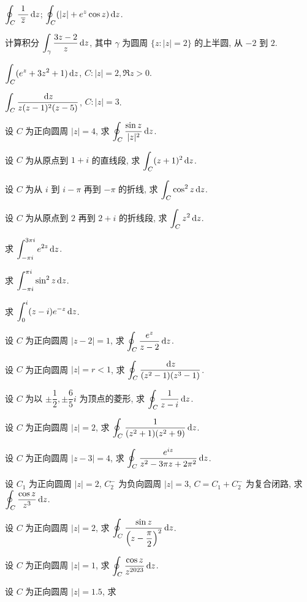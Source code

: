 \begin{homework}
\begin{exlist}
\begin{tasks}
				\task $\displaystyle\oint_C\dfrac{\ 1\ }{\overline z}\,\mathrm{d} z$;
				\task $\displaystyle\oint_C(|z|+e^z\cos z)\,\mathrm{d} z$.
			\end{tasks}
		\item 计算积分 $\displaystyle\int_\gamma\dfrac{3z-2}{z}\,\mathrm{d} z$, 其中 $\gamma$ 为圆周 $\{z: |z|=2\}$ 的上半圆, 从 $-2$ 到 $2$.
		\item $\displaystyle\int_C(e^z+3z^2+1)\,\mathrm{d} z$, $C:|z|=2,\Re z>0$.
		\item $\displaystyle\int_C\dfrac{\,\mathrm{d} z}{z(z-1)^2(z-5)}$, $C:|z|=3$.
		\item 设 $C$ 为正向圆周 $|z|=4$, 求 $\displaystyle\oint_C\dfrac{\sin z}{|z|^2}\,\mathrm{d} z$.
		\item 设 $C$ 为从原点到 $1+i$ 的直线段, 求 $\displaystyle\int_C(z+1)^2\,\mathrm{d} z$.
		\item 设 $C$ 为从 $i$ 到 $i-\pi$ 再到 $-\pi$ 的折线, 求 $\displaystyle\int_C\cos^2z\,\mathrm{d} z$.
		\item 设 $C$ 为从原点到 $2$ 再到 $2+i$ 的折线段, 求 $\displaystyle\int_Cz^2\,\mathrm{d} z$.
		\item 求 $\displaystyle\int_{-\pi i}^{3\pi i}e^{2z}\,\mathrm{d} z$.
		\item 求 $\displaystyle\int_{-\pi i}^{\pi i}\sin^2z\,\mathrm{d} z$.
		\item 求 $\displaystyle\int_0^i(z-i)e^{-z}\,\mathrm{d} z$.
		\item 设 $C$ 为正向圆周 $|z-2|=1$, 求 
			$\displaystyle\oint_C\frac{e^z}{z-2}\,\mathrm{d} z$.
		\item 设 $C$ 为正向圆周 $|z|=r<1$, 求 
			$\displaystyle\oint_C\frac{\,\mathrm{d} z}{(z^2-1)(z^3-1)}$.
		\item 设 $C$ 为以 $\pm\dfrac12,\pm\dfrac65i$ 为顶点的菱形, 求 
			$\displaystyle\oint_C\frac{1}{z-i}\,\mathrm{d} z$.
		\item 设 $C$ 为正向圆周 $|z|=2$, 求 
			$\displaystyle\oint_C\frac1{(z^2+1)(z^2+9)}\,\mathrm{d} z$.
		\item 设 $C$ 为正向圆周 $|z-3|=4$, 求 
			$\displaystyle\oint_C\frac{e^{iz}}{z^2-3\pi z+2\pi^2}\,\mathrm{d} z$.
		\item 设 $C_1$ 为正向圆周 $|z|=2$, $C_2^-$ 为负向圆周 $|z|=3$, $C=C_1+C_2^-$ 为复合闭路, 求 
			$\displaystyle\oint_C\frac{\cos z}{z^3}\,\mathrm{d} z$.
		\item 设 $C$ 为正向圆周 $|z|=2$, 求 
			$\displaystyle\oint_C\frac{\sin z}{\left(z-\dfrac\pi 2\right)^2}\,\mathrm{d} z$.
		\item 设 $C$ 为正向圆周 $|z|=1$, 求 
			$\displaystyle\oint_C\frac{\cos z}{z^{2023}}\,\mathrm{d} z$.
		\item 设 $C$ 为正向圆周 $|z|=1.5$, 求 

\end{exlist}
\end{homework}
